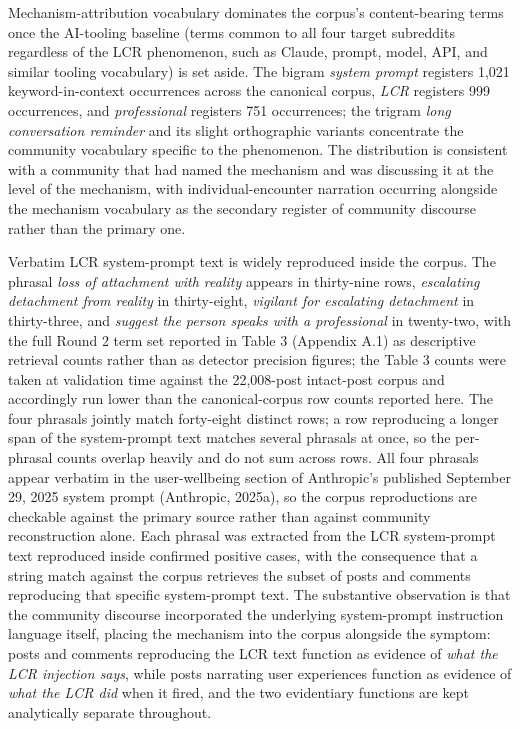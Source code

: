 \documentclass[11pt]{article}
\begin{document}
Mechanism-attribution vocabulary dominates the corpus's content-bearing terms once the AI-tooling baseline (terms common to all four target subreddits regardless of the LCR phenomenon, such as Claude, prompt, model, API, and similar tooling vocabulary) is set aside. The bigram \emph{system prompt} registers 1,021 keyword-in-context occurrences across the canonical corpus, \emph{LCR} registers 999 occurrences, and \emph{professional} registers 751 occurrences; the trigram \emph{long conversation reminder} and its slight orthographic variants concentrate the community vocabulary specific to the phenomenon. The distribution is consistent with a community that had named the mechanism and was discussing it at the level of the mechanism, with individual-encounter narration occurring alongside the mechanism vocabulary as the secondary register of community discourse rather than the primary one.

Verbatim LCR system-prompt text is widely reproduced inside the corpus. The phrasal \emph{loss of attachment with reality} appears in thirty-nine rows, \emph{escalating detachment from reality} in thirty-eight, \emph{vigilant for escalating detachment} in thirty-three, and \emph{suggest the person speaks with a professional} in twenty-two, with the full Round 2 term set reported in Table 3 (Appendix A.1) as descriptive retrieval counts rather than as detector precision figures; the Table 3 counts were taken at validation time against the 22,008-post intact-post corpus and accordingly run lower than the canonical-corpus row counts reported here. The four phrasals jointly match forty-eight distinct rows; a row reproducing a longer span of the system-prompt text matches several phrasals at once, so the per-phrasal counts overlap heavily and do not sum across rows. All four phrasals appear verbatim in the user-wellbeing section of Anthropic's published September 29, 2025 system prompt (Anthropic, 2025a), so the corpus reproductions are checkable against the primary source rather than against community reconstruction alone. Each phrasal was extracted from the LCR system-prompt text reproduced inside confirmed positive cases, with the consequence that a string match against the corpus retrieves the subset of posts and comments reproducing that specific system-prompt text. The substantive observation is that the community discourse incorporated the underlying system-prompt instruction language itself, placing the mechanism into the corpus alongside the symptom: posts and comments reproducing the LCR text function as evidence of \emph{what the LCR injection says}, while posts narrating user experiences function as evidence of \emph{what the LCR did} when it fired, and the two evidentiary functions are kept analytically separate throughout.
\end{document}
